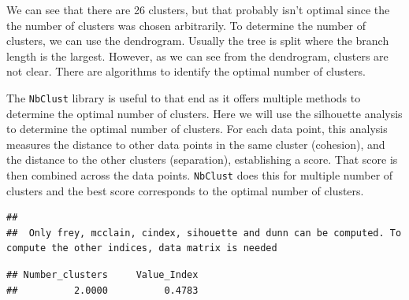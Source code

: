 \documentclass[
]{book}
\newenvironment{Shaded}{\begin{snugshade}}{\end{snugshade}}
\newcommand{\AttributeTok}[1]{\textcolor[rgb]{0.77,0.63,0.00}{#1}}
\newcommand{\CommentTok}[1]{\textcolor[rgb]{0.56,0.35,0.01}{\textit{#1}}}
\newcommand{\ConstantTok}[1]{\textcolor[rgb]{0.00,0.00,0.00}{#1}}
\newcommand{\FunctionTok}[1]{\textcolor[rgb]{0.00,0.00,0.00}{#1}}
\newcommand{\NormalTok}[1]{#1}
\newcommand{\OtherTok}[1]{\textcolor[rgb]{0.56,0.35,0.01}{#1}}
\newcommand{\SpecialCharTok}[1]{\textcolor[rgb]{0.00,0.00,0.00}{#1}}
\newcommand{\StringTok}[1]{\textcolor[rgb]{0.31,0.60,0.02}{#1}}
\begin{document}
We can see that there are 26 clusters, but that probably isn't optimal since the
the number of clusters was chosen arbitrarily. To determine the number of
clusters, we can use the dendrogram. Usually the tree is split where the branch
length is the largest. However, as we can see from the dendrogram, clusters are
not clear. There are algorithms to identify the optimal number of clusters.

The \texttt{NbClust} library is useful to that end as it offers multiple methods to
determine the optimal number of clusters. Here we will use the silhouette
analysis to determine the optimal number of clusters. For each data point, this
analysis measures the distance to other data points in the same cluster
(cohesion), and the distance to the other clusters (separation), establishing a
score. That score is then combined across the data points. \texttt{NbClust} does
this for multiple number of clusters and the best score corresponds to the
optimal number of clusters.

\begin{Shaded}
\end{Shaded}

\begin{verbatim}
## 
##  Only frey, mcclain, cindex, sihouette and dunn can be computed. To compute the other indices, data matrix is needed
\end{verbatim}

\begin{Shaded}
\end{Shaded}

\begin{verbatim}
## Number_clusters     Value_Index 
##          2.0000          0.4783
\end{verbatim}
\end{document}
